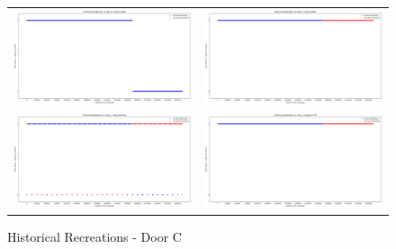 \begin{figure}
  \begin{tabular}{cc}
    {\includegraphics[width = 3in]{images/results/Historical_door_C_Duckett.png}} &
    {\includegraphics[width = 3in]{images/results/Historical_door_C_FreMEn.png}} \\
    {\includegraphics[width = 3in]{images/results/Historical_door_C_Gaussian.png}} &
    {\includegraphics[width = 3in]{images/results/Historical_door_C_HyT-EM.png}} \\
  \end{tabular}
  \caption{Historical Recreations - Door C}
\end{figure}\\ \\

